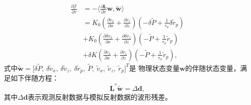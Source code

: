    \begin{equation}
    \begin{aligned}
        \frac{\partial \mathcal{J}}{\partial \tau} &= -\langle\frac{\partial \mathbf{L}}{\partial\tau}
        \mathbf{w},\tilde{\mathbf{w}} \rangle \\
        &= {K_0(\frac{\partial v_x}{\partial
        x}+\frac{\partial v_z}{\partial
    z})(-\delta\tilde{P}+\frac{1}{\tau_\sigma}\delta\tilde{r}_p)} \\
    &{+K_0(\frac{\partial \delta v_x}{\partial x}+\frac{\partial \delta
        v_z}{\partial z})(-\tilde{P}+\frac{1}{\tau_\sigma}\tilde{r}_p)} \\
        &{+\delta K(\frac{\partial v_x}{\partial x}+\frac{\partial v_z}{\partial
        z})(-\tilde{P}+\frac{1}{\tau_\sigma}\tilde{r}_p)},
    \end{aligned}
    \label{eq:gradient}
    \end{equation}
式中$\tilde{\mathbf{w}}=\lbrack \delta\tilde{P}, \ \delta \tilde{v}_x, \ \delta \tilde{v}_z, \
\delta \tilde{r}_p, \ \tilde{P}, \ \tilde{v}_x, \ \tilde{v}_z, \ \tilde{r}_p\rbrack ^T$是
物理状态变量$\mathbf{w}$的伴随状态变量，满足如下伴随方程：
\begin{equation}
	\mathbf{L}^\ast\tilde{\mathbf{w}} = \Delta\mathbf{d},
\end{equation}
其中$\Delta\mathbf{d}$表示观测反射数据与模拟反射数据的波形残差。
